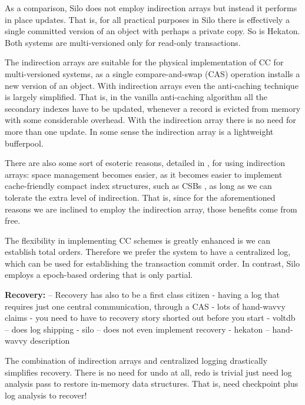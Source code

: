 As a comparison, Silo does not employ indirection arrays but instead it performs in place updates. That is, for all practical purposes in Silo there is effectively a single committed version of an object with perhaps a private copy. So is Hekaton. Both systems are multi-versioned only for read-only transactions.

The indirection arrays are suitable for the physical implementation of CC for multi-versioned systems, as a single compare-and-swap (CAS) operation installs a new version of an object. 
With indirection arrays even the anti-caching technique \cite{DeBrabantPTSZ13} is largely simplified. That is, in the vanilla anti-caching algorithm all the secondary indexes have to be updated, whenever a record is evicted from memory with some considerable overhead. With the indirection array there is no need for more than one update. 
In some sense the indirection array is a lightweight bufferpool. 

There are also some sort of esoteric reasons, detailed in , for using indirection arrays: space management becomes easier, as it becomes easier to implement cache-friendly compact index structures, such as CSBs \cite{RaoR00}, as long as we can tolerate the extra level of indirection. That is, since for the aforementioned reasons we are inclined to employ the indirection array, those benefits  come from free. 

The flexibility in implementing CC schemes is greatly enhanced is we can establish total orders. Therefore we prefer the system to have a centralized log, which can be used for establishing the transaction commit order. 
In contrast, Silo employs a epoch-based ordering that is only partial. 

{\bf Recovery:} 
-- Recovery has also to be a first class citizen
- having a log that requires just one central communication, through a CAS
- lots of hand-wavvy claims
- you need to have to recovery story shorted out before you start
- voltdb -- does log shipping
- silo -- does not even implement recovery
- hekaton -- hand-wavvy description


The combination of indirection arrays and centralized logging drastically simplifies recovery. There is no need for undo at all, redo is trivial just need log analysis pass to restore in-memory data structures. That is, need checkpoint plus log analysis to recover!

